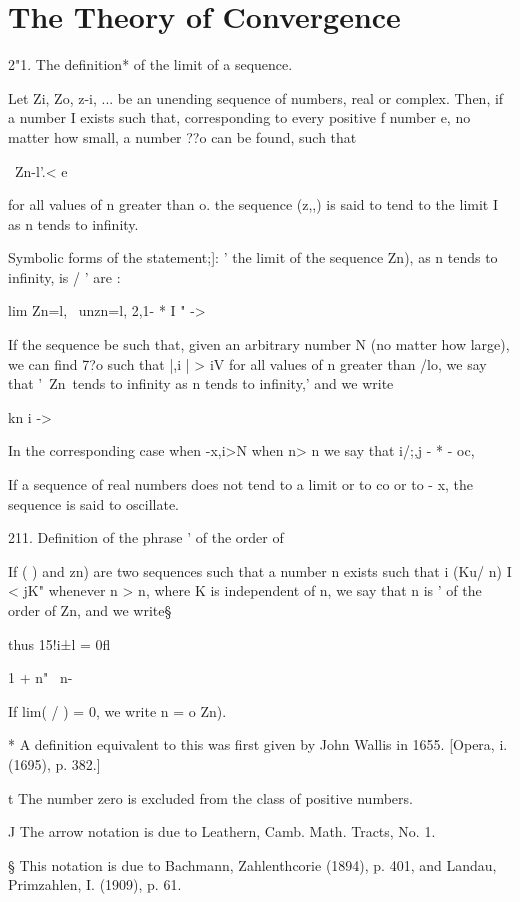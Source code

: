 \chapter{The Theory of Convergence} 

2"1. The definition* of the limit of a sequence.

Let Zi, Zo, z-i, ... be an unending sequence of numbers, real or
complex. Then, if a number I exists such that, corresponding to every
positive f number e, no matter how small, a number ??o can be found,
such that

\ Zn-l'.< e

for all values of n greater than o. the sequence (z,,) is said to tend
to the limit I as n tends to infinity.

Symbolic forms of the statement;]: ' the limit of the sequence Zn), as
n tends to infinity, is / ' are :

lim Zn=l, \ unzn=l, 2,1- * I " -> 

If the sequence be such that, given an arbitrary number N (no matter
how large), we can find 7?o such that |,i | > iV for all values of n
greater than /lo, we say that '\ Zn\ tends to infinity as n tends to
infinity,' and we write

kn i -> 

In the corresponding case when -x,i>N when n> n we say that i/;,j - *
- oc,

If a sequence of real numbers does not tend to a limit or to co or to
- x, the sequence is said to oscillate.

211. Definition of the phrase ' of the order of

If ( ) and zn) are two sequences such that a number n exists such
that i (Ku/ n) I < jK" whenever n > n, where K is independent of n,
we say that n is ' of the order of Zn, and we write§

thus 15!i±l = 0fl

1 + n" \ n-

If lim( / ) = 0, we write n = o Zn).

* A definition equivalent to this was first given by John Wallis in
1655. [Opera, i. (1695), p. 382.]

t The number zero is excluded from the class of positive numbers.

J The arrow notation is due to Leathern, Camb. Math. Tracts, No. 1.

§ This notation is due to Bachmann, Zahlenthcorie (1894), p. 401, and
Landau, Primzahlen, I. (1909), p. 61.


